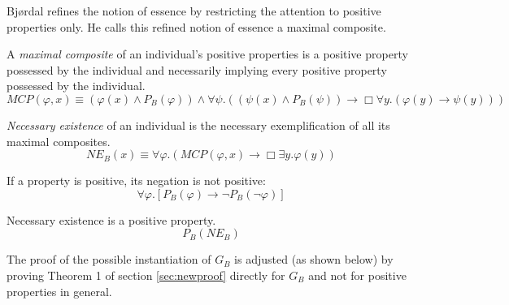 \documentclass[smallextended]{svjour3}
\newcommand{\imp}{\rightarrow}
\newcommand{\all}{\forall}
\newcommand{\ex}{\exists}
\newcommand{\nec}{\Box} %
\begin{document}
Bj{\o}rdal refines the notion of essence by restricting the attention to positive properties only. He calls this refined notion of essence a maximal composite.

\newcommand{\MCP}{\mathit{MCP}}

\begin{definition}[Changed]
\label{B:D2}
A \emph{maximal composite} of an individual's positive properties is a positive property possessed by the individual and necessarily implying every positive property possessed by the individual.
$$\MCP(\varphi, x) \equiv (\varphi(x) \wedge P_B (\varphi)) \wedge \all\psi.((\psi(x) \wedge P_B (\psi)) \imp \nec\all y.(\varphi(y) \imp \psi(y)))
$$
\end{definition}

\begin{definition}[Changed]
\label{B:D3}
\emph{Necessary existence} of an individual is the necessary exemplification of all its maximal composites.
$$
NE_B (x) \equiv \all\varphi. (\MCP(\varphi, x) \imp \nec \ex y.\varphi(y))
$$
\end{definition}

\setcounter{axiom}{0}
\begin{axiom}[Changed]
\label{A:A1'} If a property is positive, its negation is not positive: 
$$
\all \varphi. [P_B (\varphi) \imp \neg P_B (\neg\varphi)]
$$
\end{axiom}

\setcounter{axiom}{4}
\begin{axiom}
\label{A:A5'} Necessary existence is a positive property. 
$$
P_B (NE_B )
$$
\end{axiom}

The proof of the possible instantiation of $G_B$ is adjusted (as shown below) by proving Theorem 1 of section \ref{sec:newproof} directly for $G_B$ and not for positive properties in general.
\end{document}
